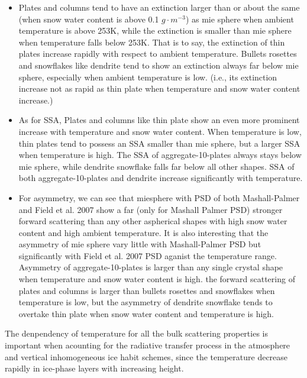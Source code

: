 \documentclass[a4paper]{report}
\begin{document}
\begin{itemize}
    \item {} 
    
    Plates and columns tend to have an extinction larger than or about the same (when snow water content is above 0.1 $g \cdot m^{-3}$) as mie sphere when ambient temperature is above 253K,
while the extinction is smaller than mie sphere when temperature falls below 253K. That is to say, the extinction of thin plates increase rapidly with respect to ambient temperature.
Bullets rosettes and snowflakes like dendrite tend to show an extinction always far below mie sphere, especially when ambient temperature is low. (i.e., its extinction
increase not as rapid as thin plate when temperature and snow water content increase.)

    \item {} 
    
    As for SSA, Plates and columns like thin plate show an even more prominent increase with temperature and snow water content. When temperature is low,
thin plates tend to possess an SSA smaller than mie sphere, but a larger SSA when temperature is high. The SSA of aggregate-10-plates 
always stays below mie sphere, while dendrite snowflake falls far below all other shapes. SSA of both aggregate-10-plates and dendrite
increase significantly with temperature.

    \item {} 
    
    For asymmetry, we can see that miesphere with PSD of both Mashall-Palmer and Field et al. 2007 show a far (only for Mashall Palmer PSD) 
stronger forward scattering than any other aspherical shapes with high snow water content and high ambient temperature. 
It is also interesting that the asymmetry of mie sphere vary little with Mashall-Palmer PSD but significantly with Field et al. 2007 PSD aganist the temperature range.
Asymmetry of aggregate-10-plates is larger than any single crystal shape when temperature and snow water content is high.
the forward scattering of plates and columns is larger than bullets rosettes and snowflakes when temperature is low, but the asymmetry
of dendrite snowflake tends to overtake thin plate when snow water content and temperature is high.
\end{itemize}

The denpendency of temperature for all the bulk scattering properties is important when acounting for the radiative transfer process in the
atmosphere and vertical inhomogeneous ice habit schemes, since the temperature decrease rapidly in ice-phase layers with increasing height.
\end{document}
